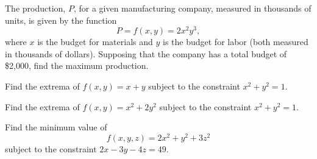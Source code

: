 \documentclass[12pt,reqno]{amsart}
\begin{document}
\bigskip

\prob The production, $P$, for a given manufacturing company, measured in thousands of units, is given by the function
	\[P = f(x,y) = 2x^2y^3,
	\]
where $x$ is the budget for materials and $y$ is the budget for labor (both measured in thousands of dollars). Supposing that the company has a total budget of \$2,000, find the maximum production.


\vfill
\prob Find the extrema of $f(x,y) = x+y$ subject to the constraint $x^2+y^2=1$.

\vfill
\newpage
\prob Find the extrema of $f(x,y) = x^2+2y^2$ subject to the constraint $x^2+y^2 = 1$.

\vfill
\prob Find the minimum value of
	\[f(x,y,z) = 2x^2 + y^2 + 3z^2
	\]
subject to the constraint $2x-3y-4z=49$.
\vfill
\end{document}
